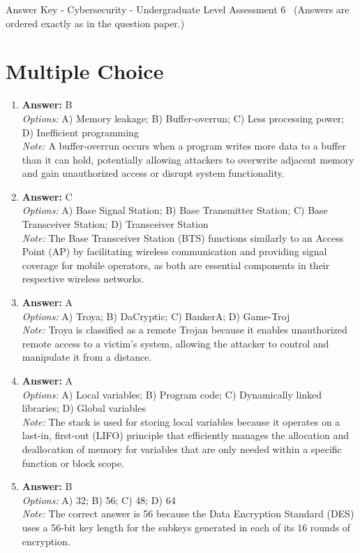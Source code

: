 \documentclass[12pt]{article}
\begin{document}
\begin{center}
Answer Key - Cybersecurity - Undergraduate Level Assessment 6 \
\small (Answers are ordered exactly as in the question paper.)
\end{center}

\section*{Multiple Choice}
\begin{enumerate}[label=\arabic*.]
\item \textbf{Answer:} B
\\ \textit{Options:} A) Memory leakage; B) Buffer-overrun; C) Less processing power; D) Inefficient programming
\\ \textit{Note:} A buffer-overrun occurs when a program writes more data to a buffer than it can hold, potentially allowing attackers to overwrite adjacent memory and gain unauthorized access or disrupt system functionality.
\item \textbf{Answer:} C
\\ \textit{Options:} A) Base Signal Station; B) Base Transmitter Station; C) Base Transceiver Station; D) Transceiver Station
\\ \textit{Note:} The Base Transceiver Station (BTS) functions similarly to an Access Point (AP) by facilitating wireless communication and providing signal coverage for mobile operators, as both are essential components in their respective wireless networks.
\item \textbf{Answer:} A
\\ \textit{Options:} A) Troya; B) DaCryptic; C) BankerA; D) Game-Troj
\\ \textit{Note:} Troya is classified as a remote Trojan because it enables unauthorized remote access to a victim's system, allowing the attacker to control and manipulate it from a distance.
\item \textbf{Answer:} A
\\ \textit{Options:} A) Local variables; B) Program code; C) Dynamically linked libraries; D) Global variables
\\ \textit{Note:} The stack is used for storing local variables because it operates on a last-in, first-out (LIFO) principle that efficiently manages the allocation and deallocation of memory for variables that are only needed within a specific function or block scope.
\item \textbf{Answer:} B
\\ \textit{Options:} A) 32; B) 56; C) 48; D) 64
\\ \textit{Note:} The correct answer is 56 because the Data Encryption Standard (DES) uses a 56-bit key length for the subkeys generated in each of its 16 rounds of encryption.
\end{enumerate}
\end{document}
